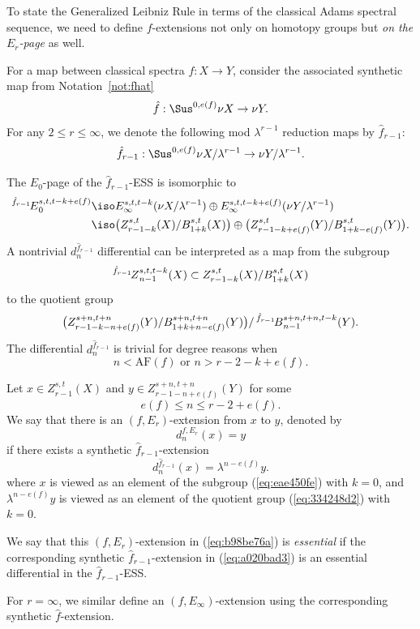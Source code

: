 \documentclass{amsart}
\numberwithin{equation}{section}
\newcommand{\AF}{\mathrm{AF}}
\newcommand{\ESS}[1]{\prescript{#1\!}{}{E}}
\newcommand{\ZESS}[1]{\prescript{#1\!}{}{Z}}
\newcommand{\BESS}[1]{\prescript{#1\!}{}{B}}
\begin{document}
To state the Generalized Leibniz Rule in terms of the classical Adams spectral sequence, we need to define $f$-extensions not only on homotopy groups but \emph{on the $E_r$-page} as well.

\begin{notation}
For a map between classical spectra $f: X\to Y$, consider the associated synthetic map from Notation~\ref{not:fhat}
$$\hat f: \Sus^{0,e(f)}\nu X\to \nu Y.$$
For any $2\le r\le \infty$, we denote the following mod $\lambda^{r-1}$ reduction maps by $\hat f_{r-1}$:
$$\hat f_{r-1}: \Sus^{0,e(f)}\nu X/\lambda^{r-1}\to \nu Y/\lambda^{r-1}.$$
\end{notation}

The $E_0$-page of the $\hat f_{r-1}$-ESS is isomorphic to
$$\begin{aligned}
    \ESS{\hat f_{r-1}}_0^{s,t,t-k+e(f)}\iso & E_\infty^{s,t,t-k}(\nu X/\lambda^{r-1})\oplus E_\infty^{s,t,t-k+e(f)}(\nu Y/\lambda^{r-1})\\
    \iso & \big(Z_{r-1-k}^{s,t}(X)/B_{1+k}^{s,t}(X)\big)\oplus \big(Z_{r-1-k+e(f)}^{s,t}(Y)/B_{1+k-e(f)}^{s,t}(Y)\big).
\end{aligned}$$
A nontrivial $d^{\hat f_{r-1}}_n$ differential can be interpreted as a map from the subgroup
\begin{equation}\label{eq:eae450fe}
  \ZESS{\hat f_{r-1}}_{n-1}^{s,t,t-k}(X) \subset  Z_{r-1-k}^{s,t}(X)/B_{1+k}^{s,t}(X)
\end{equation}
to the quotient group 
\begin{equation}\label{eq:334248d2}
    \big(Z_{r-1-k-n+e(f)}^{s+n,t+n}(Y)/B_{1+k+n-e(f)}^{s+n,t+n}(Y) \big)/\BESS{\hat f_{r-1}}_{n-1}^{s+n,t+n,t-k}(Y).
\end{equation}
The differential $d^{\hat f_{r-1}}_n$ is trivial for degree reasons when 
$$n<\AF(f)\text{ or }n>r-2-k+e(f).$$

    
\begin{definition}\label{def:6c076a33}
    Let $x\in Z^{s,t}_{r-1}(X)$ and $y\in Z^{s+n,t+n}_{r-1-n+e(f)}(Y)$ for some 
    $$e(f)\le n\le r-2+e(f).$$
    We say that there is an $(f,E_r)$-extension from $x$ to $y$, denoted by
    \begin{equation}\label{eq:b98be76a}
    d_{n}^{f,E_r}(x)=y
    \end{equation}
    if there exists a synthetic $\hat f_{r-1}$-extension
    \begin{equation}\label{eq:a020bad3}
        d_{n}^{\hat f_{r-1}}(x)=\lambda^{n-e(f)} y.
    \end{equation}
    where $x$ is viewed as an element of the subgroup (\ref{eq:eae450fe}) with $k=0$, and $\lambda^{n-e(f)} y$ is viewed as an element of the quotient group (\ref{eq:334248d2}) with $k=0$. 

   We say that this $(f,E_r)$-extension in (\ref{eq:b98be76a}) is \emph{essential} if the corresponding synthetic $\hat f_{r-1}$-extension in (\ref{eq:a020bad3}) is an essential differential in the $\hat f_{r-1}$-ESS.
    
    For $r=\infty$, we similar define an $(f,E_\infty)$-extension using the corresponding synthetic $\hat f$-extension.
\end{definition}
\end{document}
